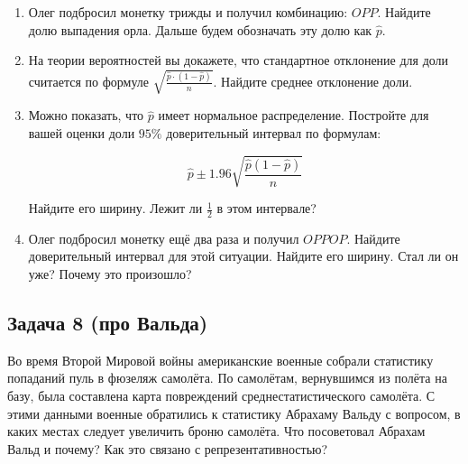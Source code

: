 \documentclass[12pt, a4paper, oneside]{article}
\begin{document}
\begin{enumerate}
	\item  Олег подбросил монетку трижды и получил комбинацию: $OPP$. Найдите долю выпадения орла.  Дальше будем обозначать эту долю как $\hat p$. 
	
	\item  На теории вероятностей вы докажете, что стандартное отклонение для доли считается по формуле $ \sqrt{\frac{\hat p \cdot (1 - \hat p)}{n}}.$ Найдите среднее отклонение доли. 
	
	\item Можно показать, что $\hat p$ имеет нормальное распределение. Постройте для вашей оценки доли $95\%$ доверительный интервал по формулам: 
	
	$$\hat{p}\pm 1.96 \sqrt{\frac{\hat{p}\left(1-\hat{p}\right)}{n}}$$
	
	Найдите его ширину.  Лежит ли $\frac{1}{2}$ в этом интервале? 
	
	\item Олег подбросил монетку ещё два раза и получил $OPPOP$. Найдите доверительный интервал для этой ситуации. Найдите его ширину. Стал ли он уже? Почему это произошло? 
\end{enumerate}


\subsection*{Задача  8 (про Вальда)} 

Во время Второй Мировой войны американские военные собрали статистику попаданий пуль в фюзеляж самолёта. По самолётам, вернувшимся из полёта на базу, была составлена карта повреждений среднестатистического самолёта. С этими данными военные обратились к статистику Абрахаму Вальду с вопросом, в каких местах следует увеличить броню самолёта. Что посоветовал Абрахам Вальд и почему? Как это связано с репрезентативностью? 
\end{document}
